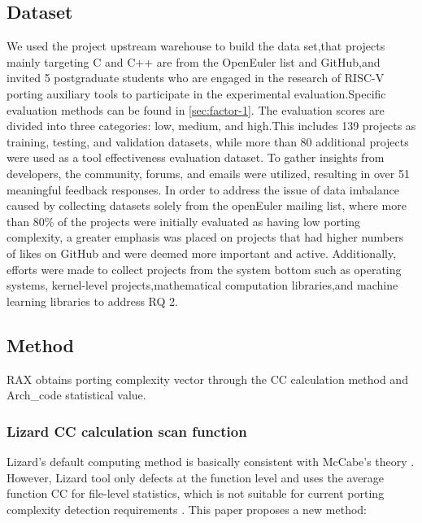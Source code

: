\documentclass[sigconf,screen,review,anonymous]{acmart}
\begin{document}



\subsection{Dataset}
We used the project upstream warehouse to build the data set,that projects mainly targeting C and C++ are from the OpenEuler list and GitHub,and invited 5 postgraduate students who are engaged in the research of RISC-V porting auxiliary tools to participate in the experimental evaluation.Specific evaluation methods can be found in \ref{sec:factor-1}. The evaluation scores are divided into three categories: low, medium, and high\citep{githuburl}.This includes 139 projects as training, testing, and validation datasets, while more than 80 additional projects were used as a tool effectiveness evaluation dataset. To gather insights from developers, the community, forums, and emails were utilized, resulting in over 51 meaningful feedback responses. In order to address the issue of data imbalance caused by collecting datasets solely from the openEuler mailing list, where more than 80\% of the projects were initially evaluated as having low porting complexity, a greater emphasis was placed on projects that had higher numbers of likes on GitHub and were deemed more important and active. Additionally, efforts were made to collect projects from the system bottom such as operating systems, kernel-level projects,mathematical computation libraries,and machine learning libraries to address RQ 2.

\subsection{Method}
\label{sec:method}
RAX obtains porting complexity vector through the CC calculation method and Arch\_code statistical value.

\subsubsection{Lizard CC calculation scan function}
Lizard's default computing method is basically consistent with McCabe's theory \cite{1702388}.
However, Lizard tool only defects at the function level and uses the average function CC for file-level statistics, which is not suitable for current porting complexity detection requirements \cite{9402593}.
This paper proposes a new method:
\end{document}
